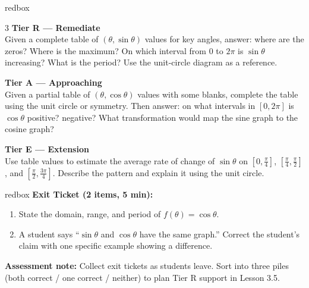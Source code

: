 \documentclass[10pt]{article}
\begin{document}
\begin{skillbox}{redbox}
\begin{multicols}{3}
    \textbf{Tier R --- Remediate}\\
    Given a complete table of $(\theta,\sin\theta)$ values for key angles, answer: where are
    the zeros? Where is the maximum? On which interval from $0$ to $2\pi$ is $\sin\theta$
    increasing? What is the period? Use the unit-circle diagram as a reference.

    \columnbreak
    \textbf{Tier A --- Approaching}\\
    Given a partial table of $(\theta,\cos\theta)$ values with some blanks, complete the table
    using the unit circle or symmetry. Then answer: on what intervals in $[0,2\pi]$ is
    $\cos\theta$ positive? negative? What transformation would map the sine graph to the cosine
    graph?

    \columnbreak
    \textbf{Tier E --- Extension}\\
    Use table values to estimate the average rate of change of $\sin\theta$ on
    $[0,\tfrac{\pi}{4}]$, $[\tfrac{\pi}{4},\tfrac{\pi}{2}]$, and
    $[\tfrac{\pi}{2},\tfrac{3\pi}{4}]$. Describe the pattern and explain it using the
    unit circle.
\end{multicols}
\end{skillbox}

\begin{skillbox}{redbox}
    \textbf{Exit Ticket (2 items, 5 min):}
    \begin{enumerate}[leftmargin=1.5em, itemsep=4pt]
        \item State the domain, range, and period of $f(\theta)=\cos\theta$.
        \item A student says ``$\sin\theta$ and $\cos\theta$ have the same graph.''
              Correct the student's claim with one specific example showing a difference.
    \end{enumerate}
    \vspace{4pt}
    \textbf{Assessment note:} Collect exit tickets as students leave. Sort into three piles
    (both correct / one correct / neither) to plan Tier R support in Lesson 3.5.
\end{skillbox}
\end{document}
